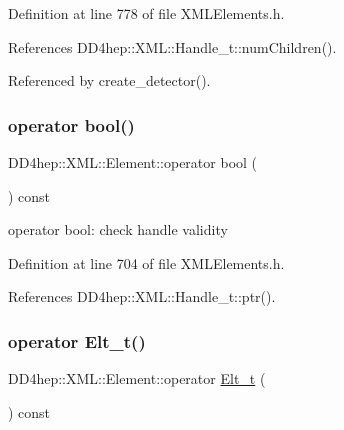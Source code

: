 Definition at line 778 of file X\+M\+L\+Elements.\+h.



References D\+D4hep\+::\+X\+M\+L\+::\+Handle\+\_\+t\+::num\+Children().



Referenced by create\+\_\+detector().

\hypertarget{class_d_d4hep_1_1_x_m_l_1_1_element_ae0a93b8933ce7644f19547b716242d47}{}\label{class_d_d4hep_1_1_x_m_l_1_1_element_ae0a93b8933ce7644f19547b716242d47} 
\subsubsection{\texorpdfstring{operator bool()}{operator bool()}}
{\footnotesize\ttfamily D\+D4hep\+::\+X\+M\+L\+::\+Element\+::operator bool (\begin{DoxyParamCaption}{ }\end{DoxyParamCaption}) const\hspace{0.3cm}{\ttfamily [inline]}}



operator bool\+: check handle validity 



Definition at line 704 of file X\+M\+L\+Elements.\+h.



References D\+D4hep\+::\+X\+M\+L\+::\+Handle\+\_\+t\+::ptr().

\hypertarget{class_d_d4hep_1_1_x_m_l_1_1_element_af983694ddf6cc41c83a6e43ed5cec266}{}\label{class_d_d4hep_1_1_x_m_l_1_1_element_af983694ddf6cc41c83a6e43ed5cec266} 
\subsubsection{\texorpdfstring{operator Elt\+\_\+t()}{operator Elt\_t()}}
{\footnotesize\ttfamily D\+D4hep\+::\+X\+M\+L\+::\+Element\+::operator \hyperlink{class_d_d4hep_1_1_x_m_l_1_1_element_af63782f6873c3d8c9b28e1777cde9275}{Elt\+\_\+t} (\begin{DoxyParamCaption}{ }\end{DoxyParamCaption}) const\hspace{0.3cm}{\ttfamily [inline]}}



